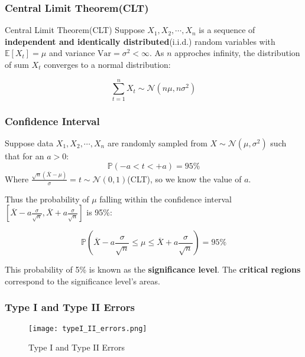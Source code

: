 \subsubsection{Central Limit Theorem(CLT)}
\begin{theorem}{Central Limit Theorem(CLT)}
    Suppose ${X_1,X_2,\cdots,X_n}$ is a sequence of \textbf{independent and identically distributed}(i.i.d.) random variables with $\mathbb{E}[X_t] = \mu$ and variance $\mathrm{Var} = \sigma^2 < \infty$. As $n$ approches infinity, the distribution of sum $X_t$ converges to a  normal distribution:

    \[
        \sum_{t=1}^nX_t \sim \mathcal{N}(n\mu,n\sigma^2)
    \]
\end{theorem}

\subsubsection{Confidence Interval}
Suppose data ${X_1,X_2,\cdots,X_n}$ are randomly sampled from $X \sim \mathcal{N}(\mu,\sigma^2)$ such that for an $a > 0$:
\[
    \mathbb{P}(-a<t<+a) = 95\%
\]
Where $\frac{\sqrt{n}(\overline{X}-\mu)}{\sigma}=t\sim \mathcal{N}(0,1)$(CLT), so we know the value of $a$.

Thus the probability of $\mu$ falling within the confidence interval $[\overline{X}-a\frac{\sigma}{\sqrt{n}}, \overline{X}+a\frac{\sigma}{\sqrt{n}}]$ is 95\%:

\[
    \mathbb{P}(\overline{X}-a\frac{\sigma}{\sqrt{n}}\leq \mu \leq \overline{X}+a\frac{\sigma}{\sqrt{n}}) = 95\%
\]

This probability of 5\% is known as the \textbf{significance level}. The \textbf{critical regions} correspond to the significance level's areas.

\subsubsection{Type I and Type II Errors}

\begin{figure}[!ht]
	\centering
	\texttt{[image: typeI\_II\_errors.png]}
	\caption{Type I and Type II Errors}
\end{figure}
